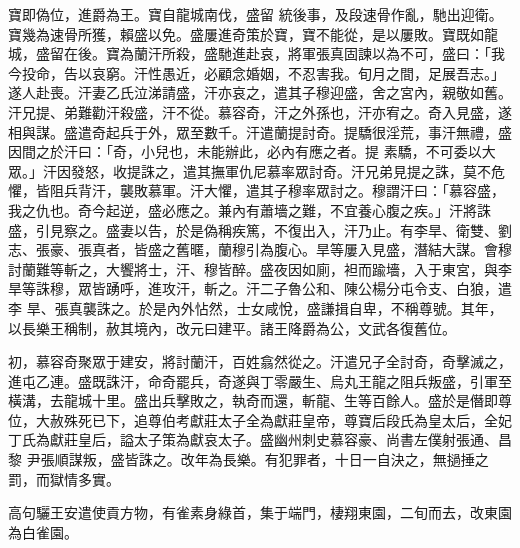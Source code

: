\begin{pinyinscope}
 寶即偽位，進爵為王。寶自龍城南伐，盛留
 統後事，及段速骨作亂，馳出迎衛。寶幾為速骨所獲，賴盛以免。盛屢進奇策於寶，寶不能從，是以屢敗。寶既如龍城，盛留在後。寶為蘭汗所殺，盛馳進赴哀，將軍張真固諫以為不可，盛曰：「我今投命，告以哀窮。汗性愚近，必顧念婚姻，不忍害我。旬月之間，足展吾志。」遂人赴喪。汗妻乙氏泣涕請盛，汗亦哀之，遣其子穆迎盛，舍之宮內，親敬如舊。汗兄提、弟難勸汗殺盛，汗不從。慕容奇，汗之外孫也，汗亦宥之。奇入見盛，遂相與謀。盛遣奇起兵于外，眾至數千。汗遣蘭提討奇。提驕很淫荒，事汗無禮，盛因間之於汗曰：「奇，小兒也，未能辦此，必內有應之者。提
 素驕，不可委以大眾。」汗因發怒，收提誅之，遣其撫軍仇尼慕率眾討奇。汗兄弟見提之誅，莫不危懼，皆阻兵背汗，襲敗慕軍。汗大懼，遣其子穆率眾討之。穆謂汗曰：「慕容盛，我之仇也。奇今起逆，盛必應之。兼內有蕭墻之難，不宜養心腹之疾。」汗將誅盛，引見察之。盛妻以告，於是偽稱疾篤，不復出入，汗乃止。有李旱、衛雙、劉志、張豪、張真者，皆盛之舊暱，蘭穆引為腹心。旱等屢入見盛，潛結大謀。會穆討蘭難等斬之，大饗將士，汗、穆皆醉。盛夜因如廁，袒而踰墻，入于東宮，與李旱等誅穆，眾皆踴呼，進攻汗，斬之。汗二子魯公和、陳公楊分屯令支、白狼，遣李
 旱、張真襲誅之。於是內外怗然，士女咸悅，盛謙揖自卑，不稱尊號。其年，以長樂王稱制，赦其境內，改元曰建平。諸王降爵為公，文武各復舊位。



 初，慕容奇聚眾于建安，將討蘭汗，百姓翕然從之。汗遣兄子全討奇，奇擊滅之，進屯乙連。盛既誅汗，命奇罷兵，奇遂與丁零嚴生、烏丸王龍之阻兵叛盛，引軍至橫溝，去龍城十里。盛出兵擊敗之，執奇而還，斬龍、生等百餘人。盛於是僭即尊位，大赦殊死已下，追尊伯考獻莊太子全為獻莊皇帝，尊寶后段氏為皇太后，全妃丁氏為獻莊皇后，謚太子策為獻哀太子。盛幽州刺史慕容豪、尚書左僕射張通、昌黎
 尹張順謀叛，盛皆誅之。改年為長樂。有犯罪者，十日一自決之，無撾捶之罰，而獄情多實。



 高句驪王安遣使貢方物，有雀素身綠首，集于端門，棲翔東園，二旬而去，改東園為白雀園。




\end{pinyinscope}
